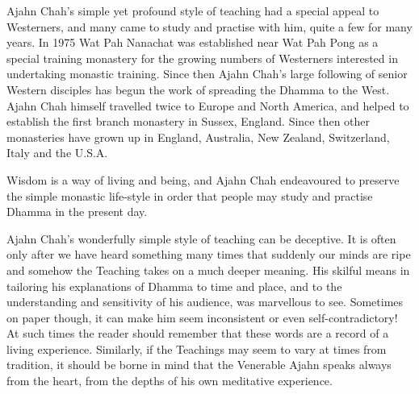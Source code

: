 Ajahn Chah’s simple yet profound style of teaching had a special appeal to Westerners, and many came to study and practise with him, quite a few for many years. In 1975 Wat Pah Nanachat was established near Wat Pah Pong as a special training monastery for the growing numbers of Westerners interested in undertaking monastic training.  Since then Ajahn Chah’s large following of senior Western disciples has begun the work of spreading the Dhamma to the West. Ajahn Chah himself travelled twice to Europe and North America, and helped to establish the first branch monastery in Sussex, England.  Since then other monasteries have grown up in England, Australia, New Zealand, Switzerland, Italy and the U.S.A.

Wisdom is a way of living and being, and Ajahn Chah endeavoured to preserve the simple monastic life-style in order that people may study and practise Dhamma in the present day.  

Ajahn Chah’s wonderfully simple style of teaching can be deceptive.  It is often only after we have heard something many times that suddenly our minds are ripe and somehow the Teaching takes on a much deeper meaning.  His skilful means in tailoring his explanations of Dhamma to time and place, and to the understanding and sensitivity of his audience, was marvellous to see.  Sometimes on paper though, it can make him seem inconsistent or even self-contradictory!  At such times the reader should remember that these words are a record of a living experience.  Similarly, if the Teachings may seem to vary at times from tradition, it should be borne in mind that the Venerable Ajahn speaks always from the heart, from the depths of his own meditative experience.
